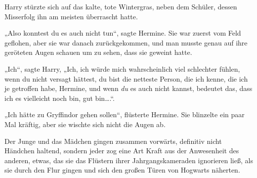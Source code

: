Harry stürzte sich auf das kalte, tote Wintergras, neben dem Schüler, dessen Misserfolg ihn am meisten überrascht hatte.

„Also konntest du es auch nicht tun“, sagte Hermine. Sie war zuerst vom Feld geflohen, aber sie war danach zurückgekommen, und man musste genau auf ihre geröteten Augen schauen um zu sehen, dass sie geweint hatte.

„Ich“, sagte Harry, „Ich, ich würde mich wahrscheinlich viel schlechter fühlen, wenn du nicht versagt hättest, du bist die netteste Person, die ich kenne, die ich je getroffen habe, Hermine, und wenn \emph{du} es auch nicht kannst, bedeutet das, dass ich es vielleicht noch bin, gut bin….“.

„Ich hätte zu Gryffindor gehen sollen“, flüsterte Hermine. Sie blinzelte ein paar Mal kräftig, aber sie wischte sich nicht die Augen ab.

\later

Der Junge und das Mädchen gingen zusammen vorwärts, definitiv nicht Händchen haltend, sondern jeder zog eine Art Kraft aus der Anwesenheit des anderen, etwas, das sie das Flüstern ihrer Jahrgangskameraden ignorieren ließ, als sie durch den Flur gingen und sich den großen Türen von Hogwarts näherten.

